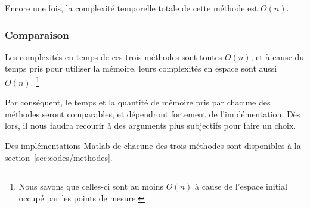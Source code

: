 Encore une fois, la complexité temporelle totale de cette méthode est $O(n)$.

\subsubsection*{Comparaison}

Les complexités en temps de ces trois méthodes sont toutes $O(n)$,
et à cause du temps pris pour utiliser la mémoire,
leurs complexités en espace sont aussi $O(n)$.%
\footnote{
    Nous savons que celles-ci sont au moins $O(n)$ à cause de l'espace
    initial occupé par les points de mesure.
}

Par conséquent, le temps et la quantité de mémoire pris par
chacune des méthodes seront comparables,
et dépendront fortement de l'implémentation.
Dès lors, il nous faudra recourir à des arguments plus subjectifs
pour faire un choix.

Des implémentations Matlab de chacune des trois méthodes sont disponibles
à la section~\ref{sec:codes/methodes}.
